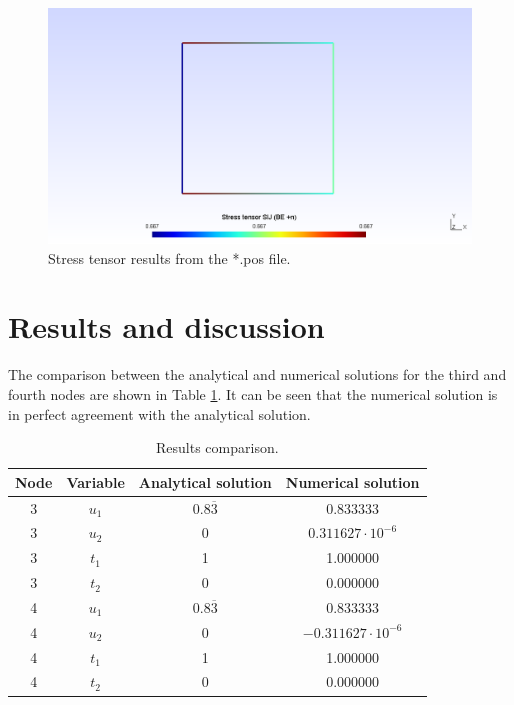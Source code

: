 \documentclass[A4]{article}
\begin{document}
\begin{figure}
	\centering
	\includegraphics[scale = 0.5]{stress.png}
	\caption{Stress tensor results from the *.pos file.}
	\label{fig:stress}
\end{figure}

\section{Results and discussion}

The comparison between the analytical and numerical solutions for the third and fourth nodes are shown in Table \ref{tab:square_results}. It can be seen that the numerical solution is in perfect agreement with the analytical solution.

\begin{table}[h]
	\begin{center}
		\begin{tabular}{|*{4}{c}|}
			\hline
			Node & Variable & Analytical solution & Numerical solution \\
			\hline
			3 & $u_1$ & $0.8\overline{3}$ & 0.833333 \\
			\hline
			3 & $u_2$ & 0 & $0.311627\cdot 10^{-6}$ \\
			\hline
			3 & $t_1$ & 1 & 1.000000 \\
			\hline
			3 & $t_2$ & $0$ & 0.000000 \\
			\hline
			4 & $u_1$ & $0.8\overline{3}$ & 0.833333 \\
			\hline
			4 & $u_2$ & 0 & $-0.311627\cdot 10^{-6}$ \\
			\hline
			4 & $t_1$ & 1 & 1.000000 \\
			\hline
			4 & $t_2$ & $0$ & 0.000000 \\
			\hline
		\end{tabular}
	\end{center}
	\caption{Results comparison.}
	\label{tab:square_results}
\end{table}
\end{document}
